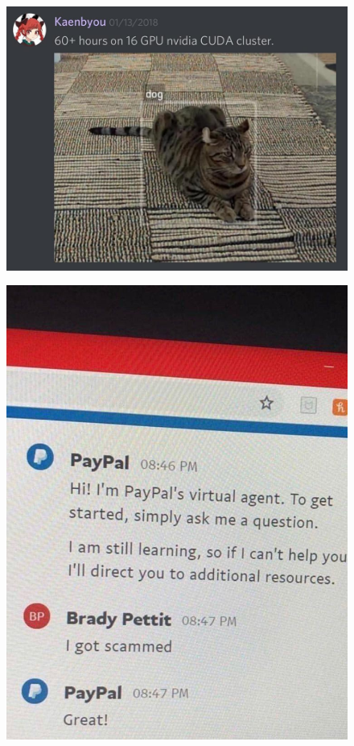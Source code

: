 \documentclass[10pt, compress]{beamer}
\begin{document}
\begin{frame}
  \vspace{.6cm}
  \begin{figure}
    \includegraphics[width=.9\linewidth]{imgs/funny_1}
  \end{figure}
\end{frame}

\begin{frame}
  \vspace{.3cm}
  \begin{figure}
    \includegraphics[width=.6\linewidth]{imgs/funny_2}
  \end{figure}
\end{frame}
\end{document}
